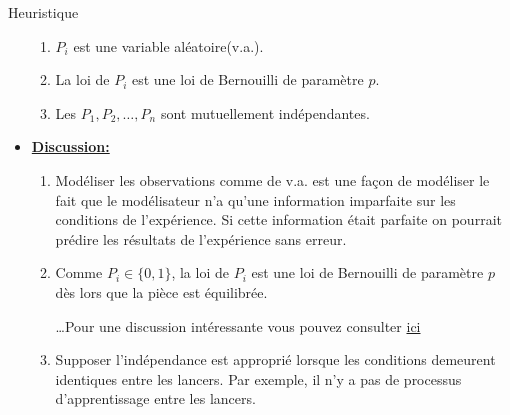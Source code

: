 \begin{frame}[allowframebreaks]{Heuristique}
\begin{itemize}
\begin{enumerate}
    \item $P_i$ est une variable aléatoire(v.a.).
    \item La loi de $P_i$ est une loi de Bernouilli de paramètre $p$.
    \item Les $P_1, P_2, \ldots, P_n$ sont mutuellement indépendantes.
\end{enumerate}

\framebreak

     \item \textbf{\underline{Discussion:}}
    \begin{enumerate}
    \item Modéliser les observations comme de v.a. est une façon de modéliser 
    le fait que le modélisateur n'a qu'une information imparfaite sur 
    les conditions de l'expérience. Si cette information était parfaite on pourrait 
    prédire les résultats de l'expérience sans erreur.
    \item Comme $P_i\in\{0, 1\}$, la loi de $P_i$ est une loi de Bernouilli de paramètre $p$ 
    dès lors que la pièce est équilibrée.
    \medskip

    \ldots Pour une discussion intéressante vous pouvez consulter 
    \href{https://softmath.seas.harvard.edu/publication/probability-geometry-and-dynamics-in-the-toss-of-a-thick-coin/}
    {ici}
    \item Supposer l'indépendance est approprié lorsque 
    les conditions demeurent identiques entre les lancers. Par exemple, 
     il n'y a pas de processus d'apprentissage entre les lancers.
    \end{enumerate}
\end{itemize}
\end{frame}


